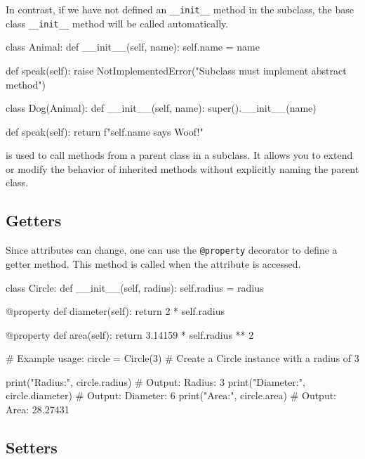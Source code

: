 In contrast, if we have not defined an \texttt{\_\_init\_\_} method in the subclass, the base class \texttt{\_\_init\_\_} method will be called automatically.

\begin{codeblock}[language=Python]
class Animal:
    def __init__(self, name):
        self.name = name

    def speak(self):
        raise NotImplementedError("Subclass must implement abstract method")

class Dog(Animal):
    def __init__(self, name):
        super().__init__(name)

    def speak(self):
        return f"{self.name} says Woof!"
\end{codeblock}

\begin{observationblock}
     is used to call methods from a parent class in a subclass. It allows you to 
    extend or modify the behavior of inherited methods without explicitly naming the parent class. 
\end{observationblock}

\subsection*{Getters}

Since attributes can change, one can use the \texttt{@property} decorator to define a getter method. This method is called when the attribute is accessed.

\begin{codeblock}[language=Python]
    class Circle:
    def __init__(self, radius):
        self.radius = radius

    @property
    def diameter(self):
        return 2 * self.radius

    @property
    def area(self):
        return 3.14159 * self.radius ** 2

# Example usage:
circle = Circle(3)  # Create a Circle instance with a radius of 3

print("Radius:", circle.radius)      # Output: Radius: 3
print("Diameter:", circle.diameter)  # Output: Diameter: 6
print("Area:", circle.area)          # Output: Area: 28.27431
\end{codeblock}

\subsection*{Setters}

